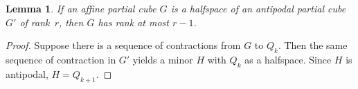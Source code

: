 \documentclass[final,11pt]{article}
\newtheorem{lem}[thm]{Lemma}%
\begin{document}
\begin{lem}\label{lem:rankantipodal}
 If an affine partial cube $G$ is a halfspace of an antipodal partial cube $G'$ of rank~$r$, then $G$ has rank at most $r-1$.
\end{lem}
\begin{proof}
 Suppose there is a sequence of contractions from $G$ to $Q_k$. Then the same sequence of contraction in $G'$ yields a minor $H$ with $Q_k$ as a halfspace. Since $H$ is antipodal, $H=Q_{k+1}$. 
\end{proof}
% 
% 
\end{document}
